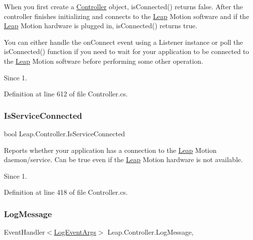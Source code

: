 When you first create a \mbox{\hyperlink{class_leap_1_1_controller}{Controller}} object, is\+Connected() returns false. After the controller finishes initializing and connects to the \mbox{\hyperlink{namespace_leap}{Leap}} Motion software and if the \mbox{\hyperlink{namespace_leap}{Leap}} Motion hardware is plugged in, is\+Connected() returns true.

You can either handle the on\+Connect event using a Listener instance or poll the is\+Connected() function if you need to wait for your application to be connected to the \mbox{\hyperlink{namespace_leap}{Leap}} Motion software before performing some other operation.

\begin{DoxySince}{Since}
1. 
\end{DoxySince}


Definition at line 612 of file Controller.\+cs.

\mbox{\label{class_leap_1_1_controller_a8ecf0fd02e617da823b46b5f73b38eb0}} 
\subsubsection{\texorpdfstring{IsServiceConnected}{IsServiceConnected}}
{\footnotesize\ttfamily bool Leap.\+Controller.\+Is\+Service\+Connected\hspace{0.3cm}{\ttfamily [get]}}



Reports whether your application has a connection to the \mbox{\hyperlink{namespace_leap}{Leap}} Motion daemon/service. Can be true even if the \mbox{\hyperlink{namespace_leap}{Leap}} Motion hardware is not available. 

\begin{DoxySince}{Since}
1. 
\end{DoxySince}


Definition at line 418 of file Controller.\+cs.

\mbox{\label{class_leap_1_1_controller_a40c12ae7c232621b91f9bb40987a33a3}} 
\subsubsection{\texorpdfstring{LogMessage}{LogMessage}}
{\footnotesize\ttfamily Event\+Handler$<$\mbox{\hyperlink{class_leap_1_1_log_event_args}{Log\+Event\+Args}}$>$ Leap.\+Controller.\+Log\+Message\hspace{0.3cm}{\ttfamily [add]}, {\ttfamily [remove]}}



